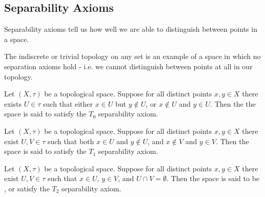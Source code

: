 \documentclass[12pt, a4paper, oneside, openright, titlepage]{book}
\begin{document}
\subsection{Separability Axioms}

\begin{rmk}
    Separability axioms tell us how well we are able to distinguish between points in a space.
\end{rmk}

\begin{eg}
    The indiscrete or trivial topology on any set is an example of a space in which no separation axioms hold - i.e. we cannot distinguish between points at all in our topology.
\end{eg}


\begin{defn}
    Let $(X,\tau)$ be a topological space. Suppose for all distinct points $x,y \in X$ there exists $U \in \tau$ such that either $x \in U$ but $y \notin U$, or $x \notin U$ and $y \in U$. Then the the space is said to satisfy the $T_0$ separability axiom.
\end{defn}


\begin{defn}
    Let $(X,\tau)$ be a topological space. Suppose for all distinct points $x,y \in X$ there exist $U,V \in \tau$ such that both $x \in U$ and $y \notin U$, and $x \notin V$ and $y \in V$. Then the space is said to satisfy the $T_1$ separability axiom.
\end{defn}


\begin{defn}
    Let $(X,\tau)$ be a topological space. Suppose for all distinct points $x,y \in X$ there exist $U,V \in \tau$ such that $x \in U$, $y \in V$, and $U\cap V = \emptyset$. Then the space is said to be , or satisfy the $T_2$ separability axiom.
\end{defn}
\end{document}
